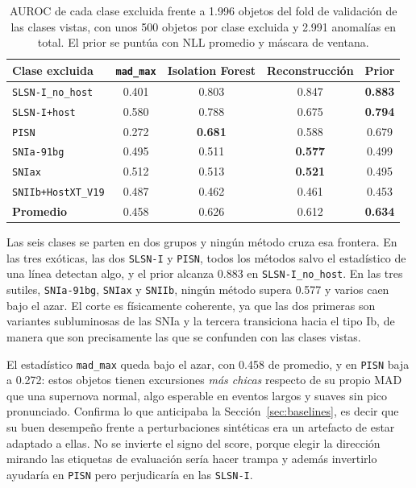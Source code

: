 \begin{table}[H]
\centering
\begin{tabular}{|l|c|c|c|c|}
\hline
\textbf{Clase excluida} & \texttt{mad\_max} & \textbf{Isolation Forest} & \textbf{Reconstrucción} & \textbf{Prior} \\
\hline
\texttt{SLSN-I\_no\_host}   & 0.401 & 0.803 & 0.847 & \textbf{0.883} \\
\texttt{SLSN-I+host}        & 0.580 & 0.788 & 0.675 & \textbf{0.794} \\
\texttt{PISN}               & 0.272 & \textbf{0.681} & 0.588 & 0.679 \\
\texttt{SNIa-91bg}          & 0.495 & 0.511 & \textbf{0.577} & 0.499 \\
\texttt{SNIax}              & 0.512 & 0.513 & \textbf{0.521} & 0.495 \\
\texttt{SNIIb+HostXT\_V19}  & 0.487 & 0.462 & 0.461 & 0.453 \\
\hline
\textbf{Promedio}           & 0.458 & 0.626 & 0.612 & \textbf{0.634} \\
\hline
\end{tabular}
\caption{AUROC de cada clase excluida frente a 1.996 objetos del fold de validación de las clases vistas, con unos 500 objetos por clase excluida y 2.991 anomalías en total. El prior se puntúa con NLL promedio y máscara de ventana.}
\label{tab:heldout_auroc}
\end{table}

Las seis clases se parten en dos grupos y ningún método cruza esa frontera. En las tres exóticas, las dos \texttt{SLSN-I} y \texttt{PISN}, todos los métodos salvo el estadístico de una línea detectan algo, y el prior alcanza 0.883 en \texttt{SLSN-I\_no\_host}. En las tres sutiles, \texttt{SNIa-91bg}, \texttt{SNIax} y \texttt{SNIIb}, ningún método supera 0.577 y varios caen bajo el azar. El corte es físicamente coherente, ya que las dos primeras son variantes subluminosas de las SNIa y la tercera transiciona hacia el tipo Ib, de manera que son precisamente las que se confunden con las clases vistas.

El estadístico \texttt{mad\_max} queda bajo el azar, con 0.458 de promedio, y en \texttt{PISN} baja a 0.272: estos objetos tienen excursiones \emph{más chicas} respecto de su propio MAD que una supernova normal, algo esperable en eventos largos y suaves sin pico pronunciado. Confirma lo que anticipaba la Sección~\ref{sec:baselines}, es decir que su buen desempeño frente a perturbaciones sintéticas era un artefacto de estar adaptado a ellas. No se invierte el signo del score, porque elegir la dirección mirando las etiquetas de evaluación sería hacer trampa y además invertirlo ayudaría en \texttt{PISN} pero perjudicaría en las \texttt{SLSN-I}.

